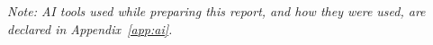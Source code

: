 \documentclass[12pt,a4paper]{article}
\numberwithin{table}{section}    %
\numberwithin{figure}{section}   %
\begin{document}
\medskip
\noindent\emph{Note: AI tools used while preparing this report, and how they were used, are declared in Appendix~\ref{app:ai}.}

\clearpage
\appendix





\end{document}

